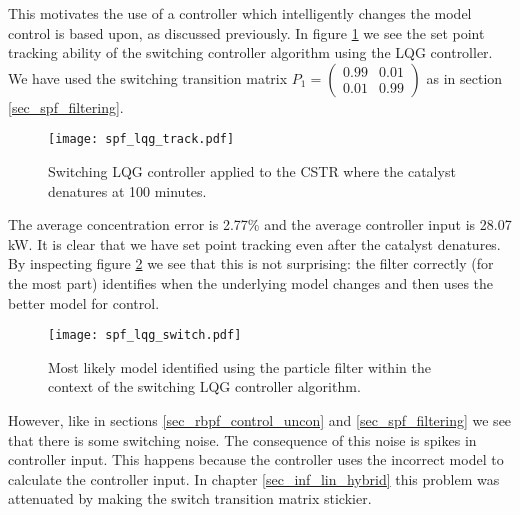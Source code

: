This motivates the use of a controller which intelligently changes the model control is based upon, as discussed previously. In figure \ref{fig_spf_lqg_track} we see the set point tracking ability of the switching controller algorithm using the LQG controller. We have used the switching transition matrix $P_1=\begin{pmatrix}
0.99 & 0.01 \\ 0.01 & 0.99
\end{pmatrix}$ as in section \ref{sec_spf_filtering}.
\begin{figure}[H] 
\centering
\texttt{[image: spf\_lqg\_track.pdf]}
\caption{Switching LQG controller applied to the CSTR where the catalyst denatures at 100 minutes.}
\label{fig_spf_lqg_track}
\end{figure}
The average concentration error is 2.77\% and the average controller input is 28.07 kW. It is clear that we have set point tracking even after the catalyst denatures. By inspecting figure \ref{fig_spf_lqg_switch} we see that this is not surprising: the filter correctly (for the most part) identifies when the underlying model changes and then uses the better model for control. 
\begin{figure}[H] 
\centering
\texttt{[image: spf\_lqg\_switch.pdf]}
\caption{Most likely model identified using the particle filter within the context of the switching LQG controller algorithm.}
\label{fig_spf_lqg_switch}
\end{figure}
However, like in sections \ref{sec_rbpf_control_uncon} and \ref{sec_spf_filtering} we see that there is some switching noise. The consequence of this noise is spikes in controller input. This happens because the controller uses the incorrect model to calculate the controller input. In chapter \ref{sec_inf_lin_hybrid} this problem was attenuated by making the switch transition matrix stickier. 

